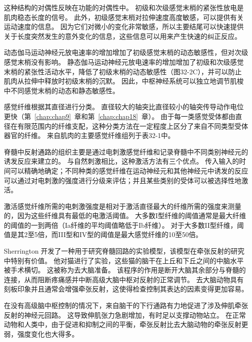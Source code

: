 \begin{proposition}[肌梭]
	\quad \quad 这种结构的对偶性反映在功能的对偶性中。
	初级和次级感觉末梢的紧张性放电是肌肉稳态长度的信号。
	此外，初级感觉末梢对拉伸速度高度敏感，可以提供有关运动速度的信息。
	因为它们对微小的变化非常敏感，所以主要结尾可以快速提供关于长度突然发生的意外变化的信息，这些信息可以用来产生快速的纠正反应。
	
	\quad \quad 动态伽马运动神经元放电速率的增加增加了初级感觉末梢的动态敏感性，但对次级感觉末梢没有影响。
	静态伽马运动神经元放电速率的增加增加了初级和次级感觉末梢的紧张性活动水平，降低了初级末梢的动态敏感性（图32-2C），并可以防止肌肉从拉伸中释放时初级末梢的沉默。
	因此，中枢神经系统可以独立地调节肌梭中不同感觉末梢的动态和静态敏感性。
	
\end{proposition}


\begin{proposition}[肌肉感觉纤维的分类] \label{box:32_2}
	
	\quad \quad 感觉纤维根据其直径进行分类。
	直径较大的轴突比直径较小的轴突传导动作电位更快（第~\ref{chap:chap9}~章和第~\ref{chap:chap18}~章）。
	由于每一类感觉受体都由直径在有限范围内的纤维支配，这种分类方法在一定程度上区分了来自不同类型受体器官的纤维。
	来自肌肉的主要感觉纤维组列于表32-1中。
	
	\quad \quad 脊髓中反射通路的组织主要是通过电刺激感觉纤维和记录脊髓中不同类别神经元的诱发反应来建立的。
	与自然刺激相比，这种激活方法有三个优点。
	传入输入的时间可以精确地确定；不同种类的感觉纤维在运动神经元和其他神经元中诱发的反应可以通过对电刺激的强度进行分级来评估；并且某些类别的受体可以被选择性地激活。
	
	\quad \quad 激活感觉纤维所需的电刺激强度是相对于激活直径最大的纤维所需的强度来测量的，因为这些纤维具有最低的电激活阈值。
	大多数I型纤维的阈值通常是最大纤维的阈值的一到两倍（Ia纤维的平均阈值略低于Ib纤维）。
	对于大多数II型纤维，阈值是其2至5倍，而III型和IV型的阈值是最大感觉纤维的10至50倍。
	
\end{proposition}


Sherrington 开发了一种用于研究脊髓回路的实验模型，该模型在牵张反射的研究中特别有价值。
他对猫进行了实验，这些猫的脑干在上丘和下丘之间的中脑水平被手术横切。
这被称为去大脑准备。
该程序的作用是断开大脑其余部分与脊髓的连接，从而阻断疼痛感并中断高级大脑中枢对反射的正常调节。
去大脑动物具有刻板印象并且通常会增强牵张反射，这使得检查控制其表达的因素变得更加容易。


在没有高级脑中枢控制的情况下，来自脑干的下行通路有力地促进了涉及伸肌牵张反射的神经元回路。
这导致伸肌张力急剧增加，有时足以支撑动物站立。
在正常动物和人类中，由于促进和抑制之间的平衡，牵张反射比去大脑动物的牵张反射更弱，强度变化也大得多。



